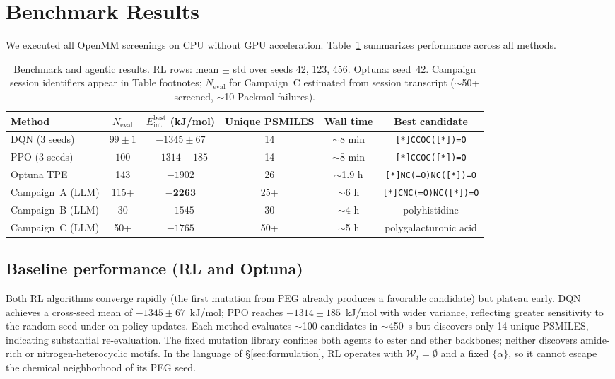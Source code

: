\documentclass[twocolumn]{fairmeta}
\begin{document}
\section{Benchmark Results}
\label{sec:results}

We executed all OpenMM screenings on CPU without GPU acceleration.
Table~\ref{tab:benchmarks} summarizes performance across all methods.

\begin{table}[t]
\centering
\caption{Benchmark and agentic results. RL rows: mean $\pm$ std over seeds 42, 123, 456. Optuna: seed~42. Campaign session identifiers appear in Table footnotes; $N_\text{eval}$ for Campaign~C estimated from session transcript (${\sim}$50+ screened, ${\sim}$10 Packmol failures).}
\label{tab:benchmarks}
\small
\begin{tabular}{lccccc}
\toprule
\textbf{Method} & \textbf{$N_\text{eval}$} & \textbf{$E_\text{int}^\text{best}$ (kJ/mol)} & \textbf{Unique PSMILES} & \textbf{Wall time} & \textbf{Best candidate} \\
\midrule
DQN (3 seeds)   & $99 \pm 1$  & $-1345 \pm 67$   & 14 & ${\sim}$8 min  & \texttt{[*]CCOC([*])=O} \\
PPO (3 seeds)   & $100$       & $-1314 \pm 185$  & 14 & ${\sim}$8 min  & \texttt{[*]CCOC([*])=O} \\
Optuna TPE      & 143         & $-1902$          & 26 & ${\sim}$1.9 h  & \texttt{[*]NC(=O)NC([*])=O} \\
Campaign~A (LLM)   & 115+        & $\mathbf{-2263}$ & 25+ & ${\sim}$6 h  & \texttt{[*]CNC(=O)NC([*])=O} \\
Campaign~B (LLM)   & 30          & $-1545$          & 30 & ${\sim}$4 h  & polyhistidine \\
Campaign~C (LLM)   & 50+         & $-1765$          & 50+ & ${\sim}$5 h  & polygalacturonic acid \\
\bottomrule
\end{tabular}
\end{table}

\subsection{Baseline performance (RL and Optuna)}

Both RL algorithms converge rapidly (the first mutation from PEG already produces a favorable candidate) but plateau early.
DQN achieves a cross-seed mean of $-1345 \pm 67$~kJ/mol; PPO reaches $-1314 \pm 185$~kJ/mol with wider variance, reflecting greater sensitivity to the random seed under on-policy updates.
Each method evaluates ${\sim}$100 candidates in ${\sim}$450~s but discovers only 14 unique PSMILES, indicating substantial re-evaluation.
The fixed mutation library confines both agents to ester and ether backbones; neither discovers amide-rich or nitrogen-heterocyclic motifs.
In the language of \S\ref{sec:formulation}, RL operates with $\mathcal{W}_t = \emptyset$ and a fixed $\{\alpha\}$, so it cannot escape the chemical neighborhood of its PEG seed.
\end{document}
